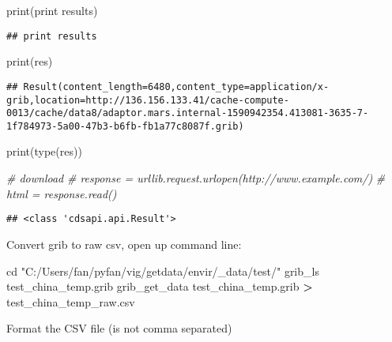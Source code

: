 \documentclass[
]{book}
\newenvironment{Shaded}{\begin{snugshade}}{\end{snugshade}}
\newcommand{\BuiltInTok}[1]{#1}
\newcommand{\CommentTok}[1]{\textcolor[rgb]{0.56,0.35,0.01}{\textit{#1}}}
\newcommand{\ExtensionTok}[1]{#1}
\newcommand{\NormalTok}[1]{#1}
\newcommand{\OperatorTok}[1]{\textcolor[rgb]{0.81,0.36,0.00}{\textbf{#1}}}
\newcommand{\StringTok}[1]{\textcolor[rgb]{0.31,0.60,0.02}{#1}}
\begin{document}
\begin{Shaded}
\begin{Highlighting}[]
\BuiltInTok{print}\NormalTok{(}\StringTok{\textquotesingle{}print results\textquotesingle{}}\NormalTok{)}
\end{Highlighting}
\end{Shaded}

\begin{verbatim}
## print results
\end{verbatim}

\begin{Shaded}
\begin{Highlighting}[]
\BuiltInTok{print}\NormalTok{(res)}
\end{Highlighting}
\end{Shaded}

\begin{verbatim}
## Result(content_length=6480,content_type=application/x-grib,location=http://136.156.133.41/cache-compute-0013/cache/data8/adaptor.mars.internal-1590942354.413081-3635-7-1f784973-5a00-47b3-b6fb-fb1a77c8087f.grib)
\end{verbatim}

\begin{Shaded}
\begin{Highlighting}[]
\BuiltInTok{print}\NormalTok{(}\BuiltInTok{type}\NormalTok{(res))}

\CommentTok{\# download }
\CommentTok{\# response = urllib.request.urlopen(\textquotesingle{}http://www.example.com/\textquotesingle{})}
\CommentTok{\# html = response.read()}
\end{Highlighting}
\end{Shaded}

\begin{verbatim}
## <class 'cdsapi.api.Result'>
\end{verbatim}

Convert grib to raw csv, open up command line:

\begin{Shaded}
\begin{Highlighting}[]
\BuiltInTok{cd} \StringTok{"C:/Users/fan/pyfan/vig/getdata/envir/\_data/test/"}
\ExtensionTok{grib\_ls}\NormalTok{ test\_china\_temp.grib}
\ExtensionTok{grib\_get\_data}\NormalTok{ test\_china\_temp.grib }\OperatorTok{\textgreater{}}\NormalTok{ test\_china\_temp\_raw.csv}
\end{Highlighting}
\end{Shaded}

Format the CSV file (is not comma separated)
\end{document}
